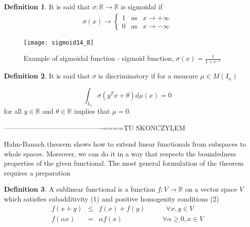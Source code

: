 \documentclass[]{article}
\theoremstyle{definition}
\newtheorem{definition}{Definition}[section]
\begin{document}
\begin{definition}
	It is said that $\sigma: \mathbb{R} \rightarrow \mathbb{R}$ is sigmoidal if
	\begin{eqnarray*}
		\sigma(x) \rightarrow \begin{cases} 1 \;\;\;\text{as} &x \rightarrow +\infty\\ 0 \;\;\;\text{as} &x \rightarrow -\infty\end{cases}
	\end{eqnarray*}
	
\end{definition}


\begin{figure}[h!]
	\centering
	\texttt{[image: sigmoid14\_8]}
	\caption{Example of sigmoidal function - sigmoid function, $\sigma(x) = \frac{1}{1+e^{-x}}$}
\end{figure}


\begin{definition}
It is said that $\sigma$ is discriminatory if for a measure $\mu \in M(I_n)$ 

$$
\int_{I_n} \sigma \left( y^Tx + \theta \right) d\mu(x) = 0
$$
for all $y\in \mathbb{R}$ and $\theta \in \mathbb{R}$ implies that $\mu = 0$.
	
\end{definition}


-------------------------------------------====TU SKONCZYLEM


Hahn-Banach theorem shows how to extend linear functionals from subspaces to whole spaces. Moreover, we can do it in a way that respects the boundedness
properties of the given functional. The most general formulation of the theorem requires a preparation

\begin{definition}
A sublinear functional is a function $f:V \rightarrow \mathbb{R}$ on a vector space $V$ which satisfies subadditivity (1) and positive homogenity conditions (2)
\begin{eqnarray}
f\left(x+y\right) &\leq& f\left(x\right) + f\left(y\right) \;\;\;\;\;\;\;\;\;\;\;\forall x,y  \in V \\
f\left(\alpha x\right) &=&\alpha f\left(x\right) \;\;\;\;\;\;\;\;\;\;\;\;\;\;\;\;\;\;\;\;\; \forall \alpha\geq 0, x \in V
\end{eqnarray}
\end{definition}
\end{document}
